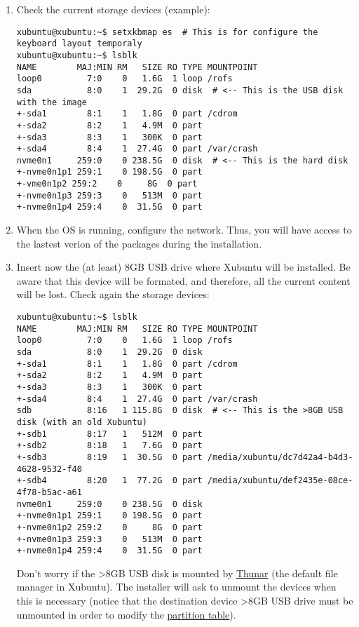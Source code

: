 \begin{enumerate}
\item Check the current storage devices (example):

\begin{verbatim}
xubuntu@xubuntu:~$ setxkbmap es  # This is for configure the keyboard layout temporaly
xubuntu@xubuntu:~$ lsblk
NAME        MAJ:MIN RM   SIZE RO TYPE MOUNTPOINT
loop0         7:0    0   1.6G  1 loop /rofs
sda           8:0    1  29.2G  0 disk  # <-- This is the USB disk with the image
+-sda1        8:1    1   1.8G  0 part /cdrom
+-sda2        8:2    1   4.9M  0 part
+-sda3        8:3    1   300K  0 part
+-sda4        8:4    1  27.4G  0 part /var/crash
nvme0n1     259:0    0 238.5G  0 disk  # <-- This is the hard disk
+-nvme0n1p1 259:1    0 198.5G  0 part
+-vme0n1p2 259:2    0     8G  0 part
+-nvme0n1p3 259:3    0   513M  0 part
+-nvme0n1p4 259:4    0  31.5G  0 part
\end{verbatim}
  
\item When the OS is running, configure the network. Thus, you will
  have access to the lastest verion of the packages during the
  installation.
  
\item Insert now the (at least) 8GB USB drive where Xubuntu will be
  installed. Be aware that this device will be formated, and
  therefore, all the current content will be lost. Check again the
  storage devices:

\begin{verbatim}
xubuntu@xubuntu:~$ lsblk
NAME        MAJ:MIN RM   SIZE RO TYPE MOUNTPOINT
loop0         7:0    0   1.6G  1 loop /rofs
sda           8:0    1  29.2G  0 disk
+-sda1        8:1    1   1.8G  0 part /cdrom
+-sda2        8:2    1   4.9M  0 part
+-sda3        8:3    1   300K  0 part
+-sda4        8:4    1  27.4G  0 part /var/crash
sdb           8:16   1 115.8G  0 disk  # <-- This is the >8GB USB disk (with an old Xubuntu)
+-sdb1        8:17   1   512M  0 part
+-sdb2        8:18   1   7.6G  0 part
+-sdb3        8:19   1  30.5G  0 part /media/xubuntu/dc7d42a4-b4d3-4628-9532-f40
+-sdb4        8:20   1  77.2G  0 part /media/xubuntu/def2435e-08ce-4f78-b5ac-a61
nvme0n1     259:0    0 238.5G  0 disk
+-nvme0n1p1 259:1    0 198.5G  0 part
+-nvme0n1p2 259:2    0     8G  0 part
+-nvme0n1p3 259:3    0   513M  0 part
+-nvme0n1p4 259:4    0  31.5G  0 part 
\end{verbatim}

  Don't worry if the >8GB USB disk is mounted by
  \href{https://gitlab.xfce.org/xfce/thunar}{Thunar} (the default file
  manager in Xubuntu). The installer will ask to unmount the devices
  when this is necessary (notice that the destination device >8GB USB
  drive must be unmounted in order to modify the
  \href{https://en.wikipedia.org/wiki/Disk_partitioning}{partition
    table}).
  

\end{enumerate}
